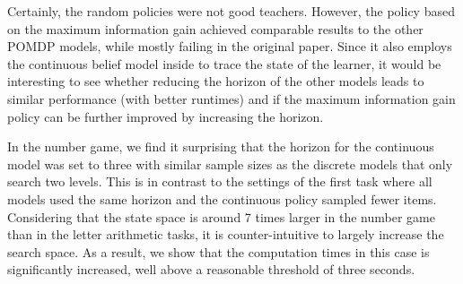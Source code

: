 
Certainly, the random policies were not good teachers.
However, the policy based on the maximum information gain achieved comparable results to the other POMDP models, while mostly failing in the original paper. 
Since it also employs the continuous belief model inside to trace the state of the learner, it would be interesting to see whether reducing the horizon of the other models leads to similar performance (with better runtimes) and if the maximum information gain policy can be further improved by increasing the horizon.

In the number game, we find it surprising that the horizon for the continuous model was set to three with similar sample sizes as the discrete models that only search two levels. 
This is in contrast to the settings of the first task where all models used the same horizon and the continuous policy sampled fewer items.
Considering that the state space is around 7 times larger in the number game than in the letter arithmetic tasks, it is counter-intuitive to largely increase the search space.
As a result, we show that the computation times in this case is significantly increased, well above a reasonable threshold of three seconds.



